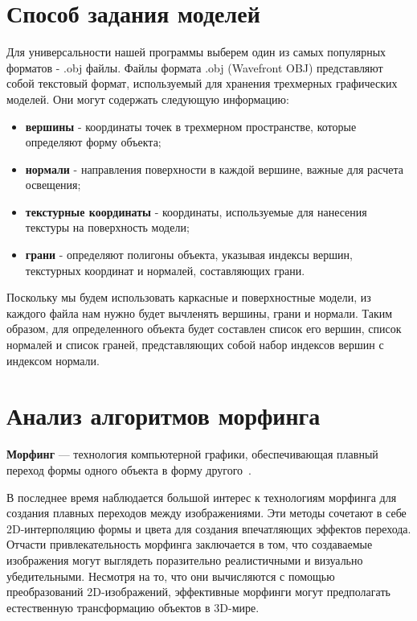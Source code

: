 \section[Способ задания моделей]{Способ задания моделей}
\label{sec:method_set_models}

Для универсальности нашей программы выберем один из самых популярных форматов - .obj файлы. 
Файлы формата .obj (Wavefront OBJ) представляют собой текстовый формат, используемый для хранения трехмерных графических 
моделей. 
Они могут содержать следующую информацию:
\begin{itemize}
	\item \textbf{вершины} - координаты точек в трехмерном пространстве, которые определяют форму объекта;
	\item \textbf{нормали} - направления поверхности в каждой вершине, важные для расчета освещения;
	\item \textbf{текстурные координаты} - координаты, используемые для нанесения текстуры на поверхность модели;
	\item \textbf{грани} - определяют полигоны объекта, указывая индексы вершин, текстурных координат и нормалей, составляющих грани.
\end{itemize}

Поскольку мы будем использовать каркасные и поверхностные модели, из каждого файла нам нужно будет вычленять вершины, грани и нормали.
Таким образом, для определенного объекта будет составлен список его вершин, список нормалей и список граней, представляющих собой набор индексов вершин с индексом нормали.

\section[Анализ алгоритмов морфинга]{Анализ алгоритмов морфинга}
\label{sec:morph_algo}
\textbf{Морфинг} --- технология компьютерной графики, обеспечивающая плавный переход формы одного объекта в форму другого~\cite{morph_spheres}.

В последнее время наблюдается большой интерес к технологиям морфинга для создания плавных переходов между изображениями. 
Эти методы сочетают в себе 2D-интерполяцию формы и цвета для создания впечатляющих эффектов перехода.
Отчасти привлекательность морфинга заключается в том, что создаваемые изображения могут выглядеть поразительно реалистичными и визуально убедительными. 
Несмотря на то, что они вычисляются с помощью преобразований 2D-изображений, эффективные морфинги могут предполагать естественную трансформацию объектов в 3D-мире.

